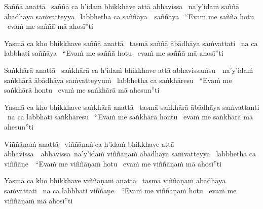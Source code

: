 \begin{pali-hang}
  Saññā anattā \breathmark\ saññā ca h'idaṁ bhikkhave attā abhavissa \breathmark\ na'y'idaṁ saññā ābādhāya saṁvatteyya \breathmark\ labbhetha ca \ifbfiveversion \mbox{saññāya}~\breathmark\ \else saññāya \breathmark\ \fi ``Evaṁ me saññā hotu \breathmark\ evaṁ me saññā mā ahosī''ti
\end{pali-hang}
\begin{pali-hang-together}
  Yasmā ca kho bhikkhave saññā anattā \breathmark\ tasmā saññā ābādhāya saṁvattati \breathmark\ na ca labbhati saññāya \breathmark\ ``Evaṁ me saññā hotu \breathmark\ evaṁ me saññā mā ahosī''ti
\end{pali-hang-together}

\begin{pali-hang}
  Saṅkhārā anattā \breathmark\ saṅkhārā ca h'idaṁ bhikkhave attā \mbox{abhavissaṁsu}~\breathmark\ na'y'idaṁ saṅkhārā ābādhāya saṁvatteyyuṁ \breathmark\ labbhetha ca saṅkhāresu \breathmark\ ``Evaṁ me saṅkhārā hontu \breathmark\ evaṁ me saṅkhārā mā ahesun''ti
\end{pali-hang}
\begin{pali-hang-together}
  Yasmā ca kho bhikkhave saṅkhārā anattā \breathmark\ tasmā saṅkhārā ābādhāya saṁvattanti \breathmark\ na ca labbhati saṅkhāresu \breathmark\ ``Evaṁ me saṅkhārā hontu \breathmark\ evaṁ me saṅkhārā mā ahesun''ti
\end{pali-hang-together}

\begin{pali-hang}
  Viññāṇaṁ anattā \breathmark\ viññāṇañ'ca h'idaṁ bhikkhave attā \ifbfiveversion \mbox{abhavissa}~\breathmark\ \else abhavissa\breathmark\ \fi na'y'idaṁ viññāṇaṁ ābādhāya saṁvatteyya \breathmark\ labbhetha ca \mbox{viññāṇe}~\breathmark\ ``Evaṁ me viññāṇaṁ hotu \breathmark\ evaṁ me viññāṇaṁ mā ahosī''ti
\end{pali-hang}
\begin{pali-hang-together}
  Yasmā ca kho bhikkhave viññāṇaṁ anattā \breathmark\ tasmā viññāṇaṁ ābādhāya saṁvattati \breathmark\ na ca labbhati \mbox{viññāṇe}~\breathmark\ ``Evaṁ me viññāṇaṁ hotu \breathmark\ evaṁ me viññāṇaṁ mā ahosī''ti
\end{pali-hang-together}

